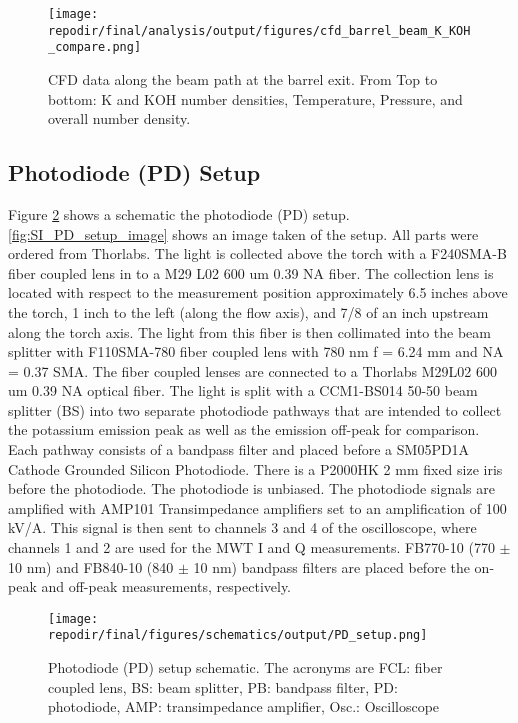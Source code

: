 \begin{figure}[]
    \centering
    \texttt{[image: \\repodir/final/analysis/output/figures/cfd\_barrel\_beam\_K\_KOH\_compare.png]}
    \caption{CFD data along the beam path at the barrel exit. From Top to bottom: K and KOH number densities, Temperature, Pressure, and overall number density. }
    \label{fig:SI_cfd_barrel_beam_K_KOH_compare}
\end{figure}



\clearpage
\subsection{Photodiode (PD) Setup}

Figure \ref{fig:SI_PD_setup_schematic} shows a schematic the photodiode (PD) setup. \ref{fig:SI_PD_setup_image} shows an image taken of the setup. All parts were ordered from Thorlabs. The light is collected above the torch with a F240SMA-B fiber coupled lens in to a M29 L02 600 um 0.39 NA fiber. The collection lens is located with respect to the measurement position approximately 6.5 inches above the torch, 1 inch to the left (along the flow axis), and 7/8 of an inch upstream along the torch axis. The light from this fiber is  then collimated into the beam splitter with F110SMA-780 fiber coupled lens with 780 nm f = 6.24 mm and NA = 0.37 SMA. The fiber coupled lenses are connected to a Thorlabs M29L02 600 um 0.39 NA optical fiber. The light is split with a CCM1-BS014 50-50 beam splitter (BS) into two separate photodiode pathways that are intended to collect the potassium emission peak as well as the emission off-peak for comparison. Each pathway consists of a bandpass filter and placed before a SM05PD1A Cathode Grounded Silicon Photodiode. There is a P2000HK 2 mm fixed size iris before the photodiode. The photodiode is unbiased.   The photodiode signals are amplified with AMP101 Transimpedance amplifiers set to an amplification of 100 kV/A. This signal is then sent to channels 3 and 4 of the oscilloscope, where channels 1 and 2 are used for the MWT  I and Q measurements.  FB770-10 (770 $\pm$ 10 nm) and FB840-10 (840 $\pm$ 10 nm) bandpass filters are placed before the on-peak and off-peak measurements, respectively. 



\begin{figure}[]
    \centering
    \texttt{[image: \\repodir/final/figures/schematics/output/PD\_setup.png]}
    \caption{Photodiode (PD) setup schematic. The acronyms are FCL: fiber coupled lens, BS: beam splitter, PB: bandpass filter, PD: photodiode, AMP: transimpedance amplifier, Osc.: Oscilloscope}
    \label{fig:SI_PD_setup_schematic}
\end{figure}



